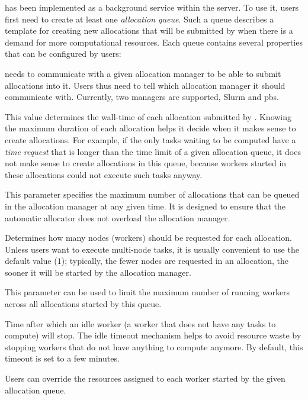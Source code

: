\Autoalloc{} has been implemented as a background service within the
\hyperqueue{} server. To use it, users first need to create at least one
\emph{allocation queue}. Such a queue describes a template for creating new allocations that will
be submitted by \hq{} when there is a demand for more computational resources.
Each queue contains several properties that can be configured by users:

\begin{description}[wide=0pt,itemsep=0pt,topsep=2pt]
	\item[Allocation manager] \Autoalloc{} needs to communicate with a given allocation manager
		to be able to submit allocations into it. Users thus need to tell \hq{} which
		allocation manager it should communicate with. Currently, two managers are supported, Slurm and
		\gls{pbs}.
	\item[Time limit] This value determines the wall-time of each allocation submitted by \autoalloc{}.
		Knowing the maximum duration of each allocation helps it decide when it makes sense to create
		allocations. For example, if the only tasks waiting to be computed have a \emph{time request}
		that is longer than the time limit of a given allocation queue, it does not make sense to create
		allocations in this queue, because workers started in these allocations could not execute such
		tasks anyway.
	\item[Backlog] This parameter specifies the maximum number of allocations that can be queued in the allocation
		manager at any given time. It is designed to ensure that the automatic allocator does not overload
		the allocation manager.
	\item[Worker count per allocation] Determines how many nodes (workers) should be requested for each allocation. Unless users want to
		execute multi-node tasks, it is usually convenient to use the default value
		($1$); typically, the fewer nodes are requested in an allocation, the sooner it
		will be started by the allocation manager.
	\item[Max worker count] This parameter can be used to limit the maximum number of running workers across all allocations
		started by this queue.
	\item[Idle timeout] Time after which an idle worker (a worker that does not have any tasks to compute) will stop. The
		idle timeout mechanism helps to avoid resource waste by stopping workers that do not have anything
		to compute anymore. By default, this timeout is set to a few minutes.
	\item[Worker resources] Users can override the resources assigned to each worker started by the given allocation queue.

\end{description}
